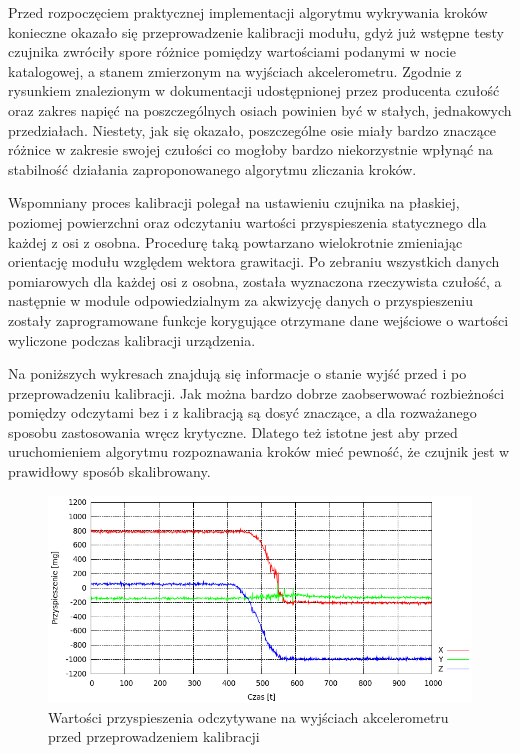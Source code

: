 Przed rozpoczęciem praktycznej implementacji algorytmu wykrywania kroków
konieczne okazało się przeprowadzenie kalibracji modułu, gdyż już wstępne testy
czujnika zwróciły spore różnice pomiędzy wartościami podanymi w nocie
katalogowej, a stanem zmierzonym na wyjściach akcelerometru. Zgodnie z rysunkiem
znalezionym w dokumentacji udostępnionej przez producenta czułość oraz zakres
napięć na poszczególnych osiach powinien być w stałych, jednakowych
przedziałach. Niestety, jak się okazało, poszczególne osie miały bardzo znaczące
różnice w zakresie swojej czułości co mogłoby bardzo niekorzystnie wpłynąć na
stabilność działania zaproponowanego algorytmu zliczania kroków. 

Wspomniany proces kalibracji polegał na ustawieniu czujnika na płaskiej,
poziomej powierzchni oraz odczytaniu wartości przyspieszenia statycznego dla
każdej z osi z osobna. Procedurę taką powtarzano wielokrotnie zmieniając
orientację modułu względem wektora grawitacji. Po zebraniu wszystkich danych
pomiarowych dla każdej osi z osobna, została wyznaczona rzeczywista czułość, a
następnie w module odpowiedzialnym za akwizycję danych o przyspieszeniu zostały
zaprogramowane funkcje korygujące otrzymane dane wejściowe o wartości wyliczone
podczas kalibracji urządzenia.

Na poniższych wykresach znajdują się informacje o stanie wyjść przed i po
przeprowadzeniu kalibracji. Jak można bardzo dobrze zaobserwować rozbieżności
pomiędzy odczytami bez i z kalibracją są dosyć znaczące, a dla rozważanego
sposobu zastosowania wręcz krytyczne. Dlatego też istotne jest aby przed
uruchomieniem algorytmu rozpoznawania kroków mieć pewność, że czujnik jest w
prawidłowy sposób skalibrowany. 
\newpage
  
\begin{figure}[h!]
 \centering
 \includegraphics[width=\textwidth]{../images/ch04/raw_acc_data.png}
 \caption{Wartości przyspieszenia odczytywane na wyjściach akcelerometru przed
 przeprowadzeniem kalibracji}
 \label{fig:MMADataRaw}
\end{figure}
  
